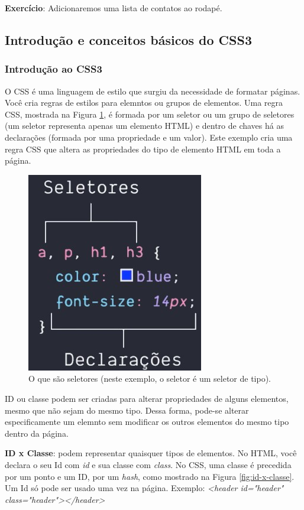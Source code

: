 \documentclass[12pt,a4paper]{article}
\begin{document}
	\textbf{Exercício}: Adicionaremos uma lista de contatos ao rodapé.
	
	\subsection{Introdução e conceitos básicos do CSS3}
	\subsubsection{Introdução ao CSS3}
	
	O CSS é uma linguagem de estilo que surgiu da necessidade de formatar páginas. Você cria regras de estilos para elemntos ou grupos de elementos. Uma regra CSS, mostrada na Figura \ref{fig:o-que-sao-seletores}, é formada por um seletor ou um grupo de seletores (um seletor representa apenas um elemento HTML) e dentro de chaves há as declarações (formada por uma propriedade e um valor). Este exemplo cria uma regra CSS que altera as propriedades do tipo de elemento HTML em toda a página.
	
	\begin{figure}[tbph!]
		\centering
		\includegraphics[width=0.3\linewidth]{images/o-que-sao-seletores}
		\caption{O que são seletores (neste exemplo, o seletor é um seletor de tipo).}
		\label{fig:o-que-sao-seletores}
	\end{figure}
	
	
	ID ou classe podem ser criadas para alterar propriedades de alguns elementos, mesmo que não sejam do mesmo tipo. Dessa forma, pode-se alterar especificamente um elemnto sem modificar os outros elementos do mesmo tipo dentro da página.
	
	\textbf{ID x Classe}: podem representar quaisquer tipos de elementos. No HTML, você declara o seu Id com \textit{id} e sua classe com \textit{class}. No CSS, uma classe é precedida por um ponto e um ID, por um \textit{hash}, como mostrado na Figura \ref{fig:id-x-classe}. Um Id só pode ser usado uma vez na página.
	Exemplo: \textit{<header id="header" class="header"></header>}
	
\end{document}
